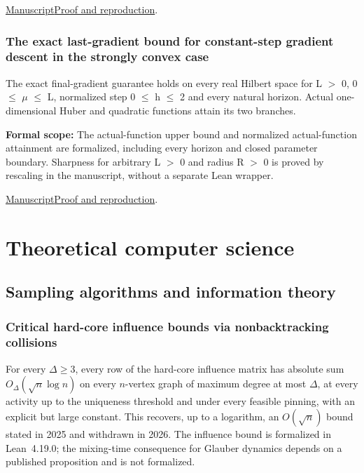 \documentclass[11pt,a4paper]{article}
\begin{document}
\noindent\href{https://github.com/dvgyl/math-and-theory/blob/main/papers/mathematics/multimarginal-minty/manuscript.pdf}{Manuscript}\quad\href{https://github.com/dvgyl/math-and-theory/blob/main/papers/mathematics/multimarginal-minty/README.md}{Proof and reproduction}.

\subsubsection{The exact last-gradient bound for constant-step gradient descent in the strongly convex case}

The exact final-gradient guarantee holds on every real Hilbert space for L $>$ 0, 0 $\leq$ $\mu$ $\leq$ L, normalized step 0 $\leq$ h $\leq$ 2 and every natural horizon. Actual one-dimensional Huber and quadratic functions attain its two branches.

\noindent\textbf{Formal scope:} The actual-function upper bound and normalized actual-function attainment are formalized, including every horizon and closed parameter boundary. Sharpness for arbitrary L $>$ 0 and radius R $>$ 0 is proved by rescaling in the manuscript, without a separate Lean wrapper.

\href{https://github.com/dvgyl/math-and-theory/blob/main/papers/mathematics/strong-gradient/manuscript.pdf}{Manuscript}\quad\href{https://github.com/dvgyl/math-and-theory/blob/main/papers/mathematics/strong-gradient/README.md}{Proof and reproduction}.

\section{Theoretical computer science}

\subsection{Sampling algorithms and information theory}

\subsubsection{Critical hard-core influence bounds via nonbacktracking collisions}

For every $\Delta\ge3$, every row of the hard-core influence matrix has absolute sum $O_\Delta(\sqrt n\log n)$ on every $n$-vertex graph of maximum degree at most $\Delta$, at every activity up to the uniqueness threshold and under every feasible pinning, with an explicit but large constant. This recovers, up to a logarithm, an $O(\sqrt n)$ bound stated in 2025 and withdrawn in 2026. The influence bound is formalized in Lean~4.19.0; the mixing-time consequence for Glauber dynamics depends on a published proposition and is not formalized.
\end{document}
